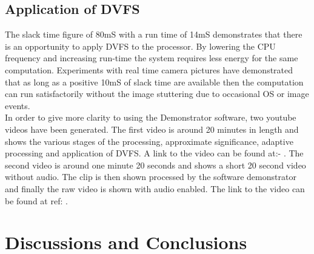 \documentclass[journal]{IEEEtran}
\begin{document}
\subsection{Application of DVFS}
The slack time figure of 80mS with a run time of 14mS demonstrates that there is an opportunity to apply DVFS to the processor. By lowering the CPU frequency and increasing run-time the system requires less energy for the same computation. Experiments with real time camera pictures have demonstrated that as long as a positive 10mS of slack time are available then the computation can run satisfactorily without the image stuttering due to occasional OS or image events. \\
In order to give more clarity to using the Demonstrator software, two youtube videos have been generated. The first video is around 20 minutes in length and shows the various stages of the processing, approximate significance, adaptive processing and application of DVFS. A link to the video can be found at:- \cite{SDAACVideo}. The second video is around one minute 20 seconds and shows a short 20 second video without audio. The clip is then shown processed by the software demonstrator and finally the raw video is shown with audio enabled. The link to the video can be found at ref: \cite{SkyVideo}.
\section{Discussions and Conclusions}

\end{document}

